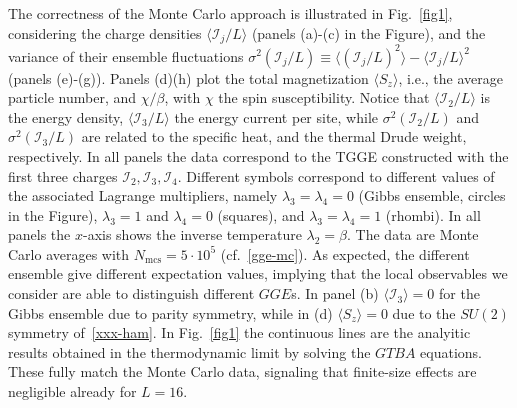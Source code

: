 \documentclass[twocolumn,superscriptaddress,prb,10pt]{revtex4-1}
\begin{document}
The correctness of the Monte Carlo approach is illustrated in Fig.~\ref{fig1}, considering 
the charge densities $\langle {\mathcal I}_j/L\rangle$ (panels (a)-(c) in the Figure), 
and the variance of their ensemble fluctuations $\sigma^2({\mathcal I}_j/L)\equiv
\langle({\mathcal I}_j/L)^2\rangle-\langle{\mathcal I}_j/L\rangle^2$ (panels (e)-(g)). 
Panels (d)(h) plot the total magnetization $\langle S_z\rangle$, i.e., the average 
particle number, and $\chi/\beta$, with $\chi$ the spin susceptibility. 
Notice that $\langle{\mathcal I}_2/L\rangle$ is the energy density, 
$\langle{\mathcal I}_3/L\rangle$ the energy current per site, while $\sigma^2({\mathcal I}_2/L)$ 
and $\sigma^2({\mathcal I}_3/L)$ are related to the specific heat, and the thermal Drude 
weight, respectively. In all panels the data correspond to the TGGE constructed with 
the first three charges ${\mathcal I}_2,{\mathcal I}_3,{\mathcal I}_4$. Different symbols 
correspond to different values of the associated Lagrange multipliers, namely 
$\lambda_3=\lambda_4=0$ (Gibbs ensemble, circles in the Figure), $\lambda_3=1$ and 
$\lambda_4=0$ (squares), and $\lambda_3=\lambda_4=1$ (rhombi). 
In all panels the $x$-axis shows the inverse temperature $\lambda_2=\beta$. The data 
are Monte Carlo averages with $N_{\textrm{mcs}}=5\cdot 10^5$ (cf.~\eqref{gge-mc}). 
As expected, the different ensemble give different expectation values, implying that 
the local observables we consider are able to distinguish different $GGE$s. In panel 
(b) $\langle {\mathcal I}_3\rangle=0$ for the Gibbs ensemble due to parity 
symmetry, while in (d) $\langle S_z\rangle=0$ due to the $SU(2)$ symmetry of~\eqref{xxx-ham}. 
In Fig.~\ref{fig1} the continuous lines are the analyitic results obtained 
in the thermodynamic limit by solving the $GTBA$ equations. These fully match the Monte 
Carlo data, signaling  that finite-size effects are negligible already for $L=16$.  
\end{document}
